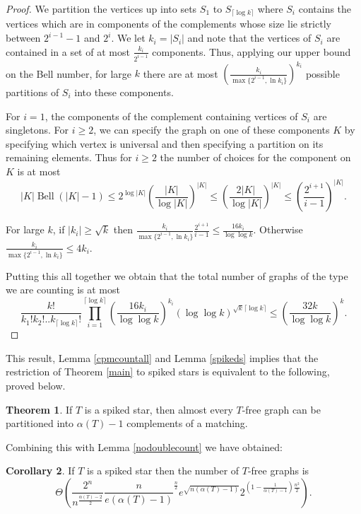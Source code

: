 \documentclass[12pt]{article}
\theoremstyle{definition}
\newtheorem{theorem}{Theorem}[section]
\newtheorem{corollary}[theorem]{Corollary}
\DeclareMathOperator{\Bell}{Bell}
\begin{document}
\begin{proof}
We partition the vertices up into sets $S_1$ to $S_{\lceil \log k \rceil}$ where $S_i$ 
contains the vertices which are in components of the complements whose size lie  strictly 
between $2^{i-1}-1$
and $2^i$. We let $k_i=|S_i|$ and note that the vertices of $S_i$ 
are contained in a set of at most $\frac{k_i}{2^{i-1}}$ 
components.  Thus, applying our upper bound on the Bell number, for large $k$
there are at most $(\frac{k_i}{\max\{2^{i-1},\ln k_i\}})^{k_i}$ possible partitions 
of $S_i$ into these components. 

For $i=1$, the components of the complement containing vertices of $S_i$ are singletons. For $i \ge 2$,
we can specify the graph on one of these components $K$
by specifying which vertex is universal and then specifying a partition on its remaining elements.
Thus for $i \ge 2$ the number of choices for the component on $K$  is  at most $$|K|\Bell(|K|-1)\le 2^{\log |K|} (\frac{|K|}{\log |K|})^{|K|} \le (\frac{2|K|}{\log |K|})^{|K|}
\le (\frac{2^{i+1}}{i-1})^{|K|}.$$

For large $k$,  if $|k_i| \ge \sqrt{k}$ then $\frac{k_i}{\max\{2^{i-1},\ln k_i\}}\frac{2^{i+1}}{i-1}\le  \frac{16 k_i}{\log \log k} $. Otherwise $\frac{k_i}{\max\{2^{i-1},\ln k_i\}}  \le 4k_i$.

Putting this all together we obtain that the total number of graphs of the type we are counting is at most
$$\frac{k!}{k_1!k_2!..k_{\lceil \log k \rceil}!}\prod_{i=1}^{\lceil \log k \rceil} (\frac{16k_i}{\log \log k})^{k_i} (\log \log k)^{\sqrt{k}\lceil \log k \rceil} \le (\frac{32k}{\log \log k})^k.$$
\end{proof} 

This result, Lemma \ref{cpmcountall}   and Lemma \ref{spikeds} implies that the restriction of Theorem \ref{main}
to spiked stars is   equivalent to the following, proved below. 


\begin{theorem}
\label{tss}
If $T$ is  a spiked star,  then almost every $T$-free graph can be partitioned into 
$\alpha(T)-1$ complements of a matching. 
\end{theorem}

Combining this with Lemma \ref{nodoublecount} we have obtained: 

\begin{corollary}
\label{cnpm}
    If $T$ is a spiked  star  then the number of $T$-free graphs is 
    \[\Theta(\frac{2^n}{n^\frac{\alpha(T)-2}{2}}\frac{n}{e(\alpha(T)-1)}^\frac{n}{2}e^{\sqrt{n(\alpha(T)-1)}}2^{(1-\frac{1}{\alpha(T)-1})\frac{n^2}{2}}).\]
\end{corollary}
\end{document}
